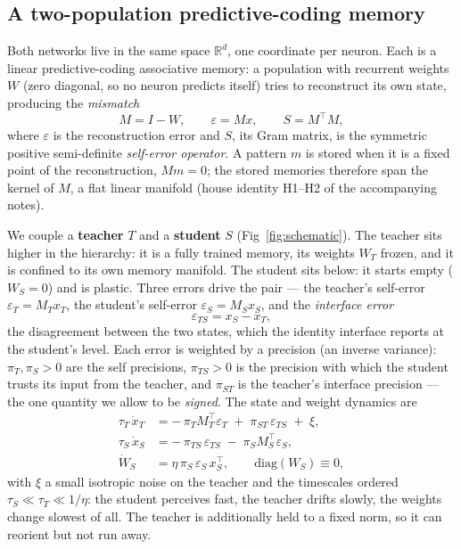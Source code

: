 \documentclass[10pt,letterpaper]{article}
\theoremstyle{plain}
\theoremstyle{remark}
\newcommand{\R}{\mathbb{R}}
\newcommand{\eps}{\varepsilon}
\newcommand{\xT}{x_T}
\newcommand{\xS}{x_S}
\newcommand{\WT}{W_T}
\newcommand{\WS}{W_S}
\newcommand{\MT}{M_T}
\newcommand{\MS}{M_S}
\newcommand{\epsT}{\eps_T}
\newcommand{\epsS}{\eps_S}
\newcommand{\epsTS}{\eps_{TS}}
\newcommand{\piT}{\pi_T}
\newcommand{\piS}{\pi_S}
\newcommand{\piTS}{\pi_{TS}}
\newcommand{\piST}{\pi_{ST}}
\newcommand{\tauT}{\tau_T}
\newcommand{\tauS}{\tau_S}
\newcommand{\tr}{^{\!\top}}
\begin{document}
\subsection{A two-population predictive-coding memory}
\label{sec:model}
Both networks live in the same space $\R^{d}$, one coordinate per neuron. Each is a linear
predictive-coding associative memory: a population with recurrent weights $W$ (zero diagonal, so no
neuron predicts itself) tries to reconstruct its own state, producing the \emph{mismatch}
\begin{equation}
\label{eq:mismatch}
M = I - W, \qquad \eps = M x, \qquad S = M\tr M,
\end{equation}
where $\eps$ is the reconstruction error and $S$, its Gram matrix, is the symmetric positive
semi-definite \emph{self-error operator}. A pattern $m$ is stored when it is a fixed point of the
reconstruction, $M m = 0$; the stored memories therefore span the kernel of $M$, a flat linear
manifold (house identity H1--H2 of the accompanying notes).

We couple a \textbf{teacher} $T$ and a \textbf{student} $S$ (Fig~\ref{fig:schematic}). The teacher sits
higher in the hierarchy: it is a fully trained memory, its weights $\WT$ frozen, and it is confined to
its own memory manifold. The student sits below: it starts empty ($\WS=0$) and is plastic. Three errors
drive the pair --- the teacher's self-error $\epsT=\MT\xT$, the student's self-error $\epsS=\MS\xS$, and
the \emph{interface error}
\begin{equation}
\label{eq:interface}
\epsTS = \xS - \xT,
\end{equation}
the disagreement between the two states, which the identity interface reports at the student's level.
Each error is weighted by a precision (an inverse variance): $\piT,\piS>0$ are the self precisions,
$\piTS>0$ is the precision with which the student trusts its input from the teacher, and $\piST$ is the
teacher's interface precision --- the one quantity we allow to be \emph{signed}. The state and weight
dynamics are
\begin{align}
\tauT\,\dot\xT &= -\,\piT \MT\tr\epsT \;+\; \piST\,\epsTS \;+\; \xi, \label{eq:teacher}\\
\tauS\,\dot\xS &= -\,\piTS\,\epsTS \;-\; \piS \MS\tr\epsS, \label{eq:student}\\
\dot\WS &= \eta\,\piS\,\epsS\,\xS\tr, \qquad \mathrm{diag}(\WS)\equiv 0, \label{eq:learn}
\end{align}
with $\xi$ a small isotropic noise on the teacher and the timescales ordered
$\tauS \ll \tauT \ll 1/\eta$: the student perceives fast, the teacher drifts slowly, the weights change
slowest of all. The teacher is additionally held to a fixed norm, so it can reorient but not run away.
\end{document}
